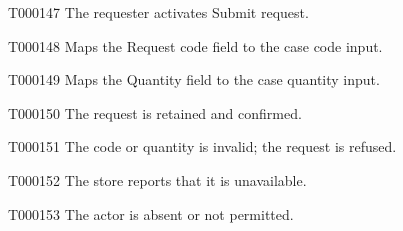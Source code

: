 \documentclass[11pt,a4paper]{article}
\begin{document}
\begin{atlasparagraph}{T000147}
The requester activates Submit request.
\end{atlasparagraph}
\begin{atlasparagraph}{T000148}
Maps the Request code field to the case code input.
\end{atlasparagraph}
\begin{atlasparagraph}{T000149}
Maps the Quantity field to the case quantity input.
\end{atlasparagraph}
\begin{atlasparagraph}{T000150}
The request is retained and confirmed.
\end{atlasparagraph}
\begin{atlasparagraph}{T000151}
The code or quantity is invalid; the request is refused.
\end{atlasparagraph}
\begin{atlasparagraph}{T000152}
The store reports that it is unavailable.
\end{atlasparagraph}
\begin{atlasparagraph}{T000153}
The actor is absent or not permitted.
\end{atlasparagraph}
\end{document}
